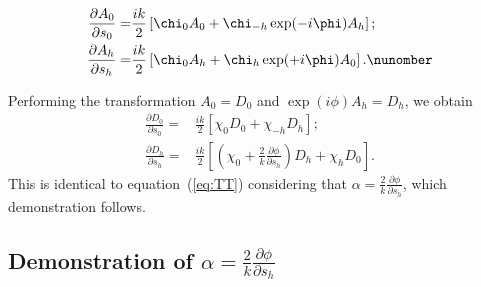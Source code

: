 \documentclass[preprint]{iucr}              %
\begin{document}
\begin{subequations}
\begin{align}
\frac{\partial A_0}{\partial s_0} =& \frac{ik}{2} \left[ \chi_0 A_0+ \chi_{-h} \exp(-i\phi) A_h\right]; \nonumber \\
\frac{\partial A_h}{\partial s_h} =& \frac{ik}{2} \left[ \chi_0 A_h+ \chi_{h} \exp(+i\phi) A_0\right]. \nunomber
\end{align}
\end{subequations}

Performing the transformation $A_0=D_0$ and $\exp(i\phi) A_h=D_h$, we obtain
\begin{subequations}
\begin{align}
\frac{\partial D_0}{\partial s_0} =& \frac{ik}{2} \left[ \chi_0 D_0+ \chi_{-h} D_h\right]; \\
\frac{\partial D_h}{\partial s_h} =& \frac{ik}{2} \left[ (\chi_0 + \frac{2}{k}\frac{\partial\phi}{\partial s_h} ) D_h+ \chi_{h} D_0\right].
\end{align}
\end{subequations}
This is identical to equation~(\ref{eq:TT}) considering that $\alpha=\frac{2}{k}\frac{\partial\phi}{\partial s_h}$, which demonstration follows.

\subsection{Demonstration of $\alpha=\frac{2}{k}\frac{\partial\phi}{\partial s_h}$ }
\end{document}
